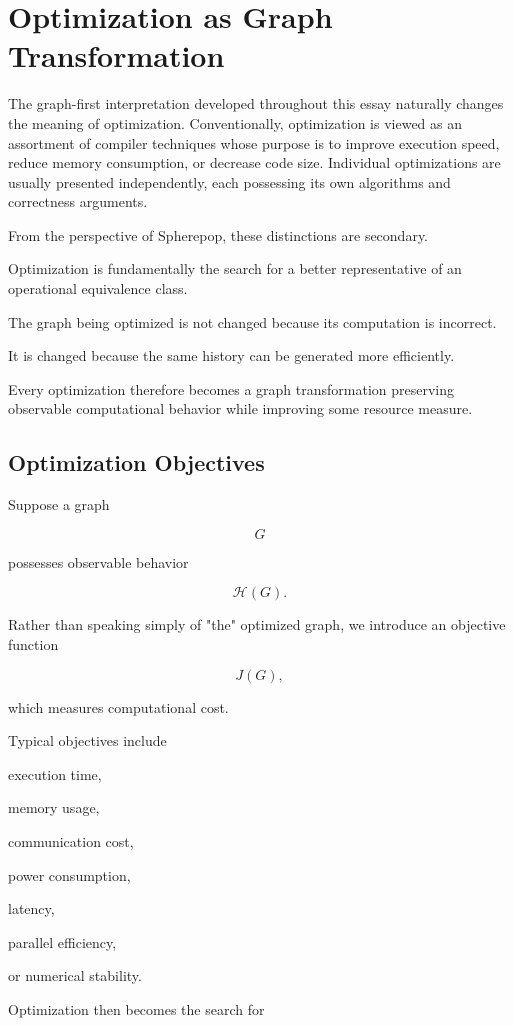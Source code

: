 \documentclass[12pt,oneside]{article}
\begin{document}
\section{Optimization as Graph Transformation}

The graph-first interpretation developed throughout this essay naturally changes the meaning of optimization. Conventionally, optimization is viewed as an assortment of compiler techniques whose purpose is to improve execution speed, reduce memory consumption, or decrease code size. Individual optimizations are usually presented independently, each possessing its own algorithms and correctness arguments.

From the perspective of Spherepop, these distinctions are secondary.

Optimization is fundamentally the search for a better representative of an operational equivalence class.

The graph being optimized is not changed because its computation is incorrect.

It is changed because the same history can be generated more efficiently.

Every optimization therefore becomes a graph transformation preserving observable computational behavior while improving some resource measure.

\subsection{Optimization Objectives}

Suppose a graph

\[
G
\]

possesses observable behavior

\[
\mathcal H(G).
\]

Rather than speaking simply of "the" optimized graph, we introduce an objective function

\[
J(G),
\]

which measures computational cost.

Typical objectives include

execution time,

memory usage,

communication cost,

power consumption,

latency,

parallel efficiency,

or numerical stability.

Optimization then becomes the search for
\end{document}
